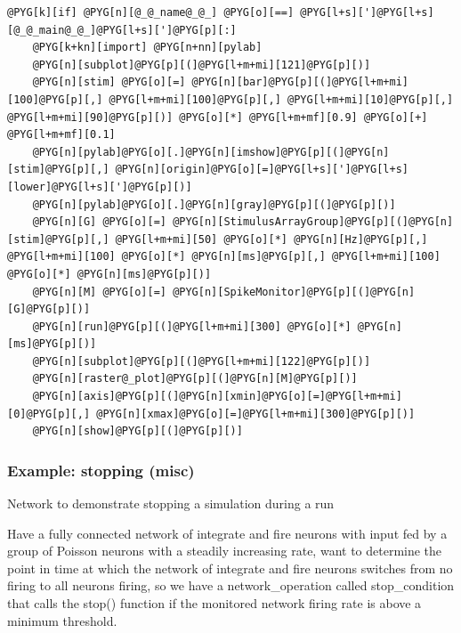 \documentclass[letterpaper,10pt,english]{manual}
\begin{document}
\begin{Verbatim}[commandchars=@\[\]]
@PYG[k][if] @PYG[n][@_@_name@_@_] @PYG[o][==] @PYG[l+s][']@PYG[l+s][@_@_main@_@_]@PYG[l+s][']@PYG[p][:]
    @PYG[k+kn][import] @PYG[n+nn][pylab]
    @PYG[n][subplot]@PYG[p][(]@PYG[l+m+mi][121]@PYG[p][)]
    @PYG[n][stim] @PYG[o][=] @PYG[n][bar]@PYG[p][(]@PYG[l+m+mi][100]@PYG[p][,] @PYG[l+m+mi][100]@PYG[p][,] @PYG[l+m+mi][10]@PYG[p][,] @PYG[l+m+mi][90]@PYG[p][)] @PYG[o][*] @PYG[l+m+mf][0.9] @PYG[o][+] @PYG[l+m+mf][0.1]
    @PYG[n][pylab]@PYG[o][.]@PYG[n][imshow]@PYG[p][(]@PYG[n][stim]@PYG[p][,] @PYG[n][origin]@PYG[o][=]@PYG[l+s][']@PYG[l+s][lower]@PYG[l+s][']@PYG[p][)]
    @PYG[n][pylab]@PYG[o][.]@PYG[n][gray]@PYG[p][(]@PYG[p][)]
    @PYG[n][G] @PYG[o][=] @PYG[n][StimulusArrayGroup]@PYG[p][(]@PYG[n][stim]@PYG[p][,] @PYG[l+m+mi][50] @PYG[o][*] @PYG[n][Hz]@PYG[p][,] @PYG[l+m+mi][100] @PYG[o][*] @PYG[n][ms]@PYG[p][,] @PYG[l+m+mi][100] @PYG[o][*] @PYG[n][ms]@PYG[p][)]
    @PYG[n][M] @PYG[o][=] @PYG[n][SpikeMonitor]@PYG[p][(]@PYG[n][G]@PYG[p][)]
    @PYG[n][run]@PYG[p][(]@PYG[l+m+mi][300] @PYG[o][*] @PYG[n][ms]@PYG[p][)]
    @PYG[n][subplot]@PYG[p][(]@PYG[l+m+mi][122]@PYG[p][)]
    @PYG[n][raster@_plot]@PYG[p][(]@PYG[n][M]@PYG[p][)]
    @PYG[n][axis]@PYG[p][(]@PYG[n][xmin]@PYG[o][=]@PYG[l+m+mi][0]@PYG[p][,] @PYG[n][xmax]@PYG[o][=]@PYG[l+m+mi][300]@PYG[p][)]
    @PYG[n][show]@PYG[p][(]@PYG[p][)]
\end{Verbatim}

\resetcurrentobjects
\hypertarget{--doc-examples-misc_stopping}{}

\hypertarget{index-67}{}\subsubsection{Example: stopping (misc)}

Network to demonstrate stopping a simulation during a run

Have a fully connected network of integrate and fire neurons
with input fed by a group of Poisson neurons with a steadily
increasing rate, want to determine the point in time at which
the network of integrate and fire neurons switches from no
firing to all neurons firing, so we have a network\_operation
called stop\_condition that calls the stop() function if the
monitored network firing rate is above a minimum threshold.
\end{document}
